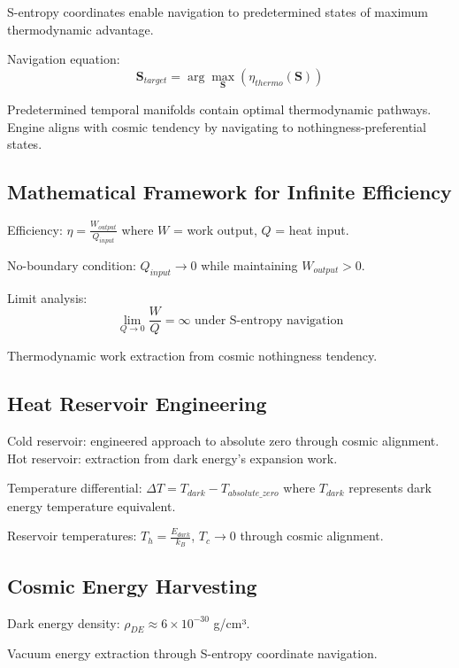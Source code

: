 \documentclass[12pt,a4paper]{article}
\begin{document}
S-entropy coordinates enable navigation to predetermined states of maximum thermodynamic advantage.

Navigation equation:
\begin{equation}
\mathbf{S}_{target} = \arg \max_{\mathbf{S}} \left( \eta_{thermo}(\mathbf{S}) \right)
\end{equation}

Predetermined temporal manifolds contain optimal thermodynamic pathways. Engine aligns with cosmic tendency by navigating to nothingness-preferential states.

\subsection{Mathematical Framework for Infinite Efficiency}

Efficiency: $\eta = \frac{W_{output}}{Q_{input}}$ where $W$ = work output, $Q$ = heat input.

No-boundary condition: $Q_{input} \to 0$ while maintaining $W_{output} > 0$.

Limit analysis:
\begin{equation}
\lim_{Q \to 0} \frac{W}{Q} = \infty \text{ under S-entropy navigation}
\end{equation}

Thermodynamic work extraction from cosmic nothingness tendency.

\subsection{Heat Reservoir Engineering}

Cold reservoir: engineered approach to absolute zero through cosmic alignment.
Hot reservoir: extraction from dark energy's expansion work.

Temperature differential: $\Delta T = T_{dark} - T_{absolute\_zero}$ where $T_{dark}$ represents dark energy temperature equivalent.

Reservoir temperatures: $T_h = \frac{E_{dark}}{k_B}$, $T_c \to 0$ through cosmic alignment.

\subsection{Cosmic Energy Harvesting}

Dark energy density: $\rho_{DE} \approx 6 \times 10^{-30}$ g/cm³.

Vacuum energy extraction through S-entropy coordinate navigation.
\end{document}
